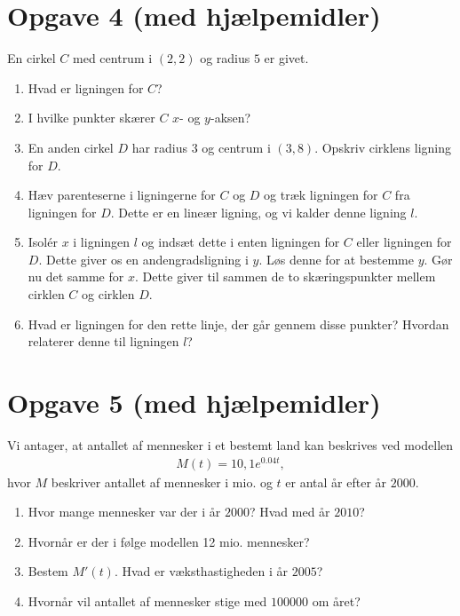 \section*{Opgave 4 \large (med hjælpemidler)}

En cirkel $C$ med centrum i $(2,2)$ og radius $5$ er givet.
\begin{enumerate}[label=\roman*)]
\item Hvad er ligningen for $C$?
\item I hvilke punkter skærer $C$ $x$- og $y$-aksen?
\item En anden cirkel $D$ har radius $3$ og centrum i $(3,8)$. Opskriv cirklens ligning for $D$.
\item Hæv parenteserne i ligningerne for $C$ og $D$ og træk ligningen for $C$ fra ligningen for $D$. Dette er en lineær ligning, og vi kalder denne ligning $l$.
\item Isolér $x$ i ligningen $l$ og indsæt dette i enten ligningen for $C$ eller ligningen for $D$. Dette giver os en andengradsligning i $y$. Løs denne for at bestemme $y$. Gør nu det samme for $x$. Dette giver til sammen de to skæringspunkter mellem cirklen $C$ og cirklen $D$. 
\item Hvad er ligningen for den rette linje, der går gennem disse punkter? Hvordan relaterer denne til ligningen $l$?
\end{enumerate}

\section*{Opgave 5 \large (med hjælpemidler)}
Vi antager, at antallet af mennesker i et bestemt land kan beskrives ved modellen
\begin{align*}
M(t) = 10,1e^{0.04t},
\end{align*}
hvor $M$ beskriver antallet af mennesker i mio. og $t$ er antal år efter år $2000$. 
\begin{enumerate}[label=\roman*)]
\item Hvor mange mennesker var der i år $2000$? Hvad med år $2010$?
\item Hvornår er der i følge modellen 12 mio. mennesker?
\item Bestem $M'(t)$. Hvad er væksthastigheden i år $2005$? 
\item Hvornår vil antallet af mennesker stige med $100000$ om året?
\end{enumerate}
